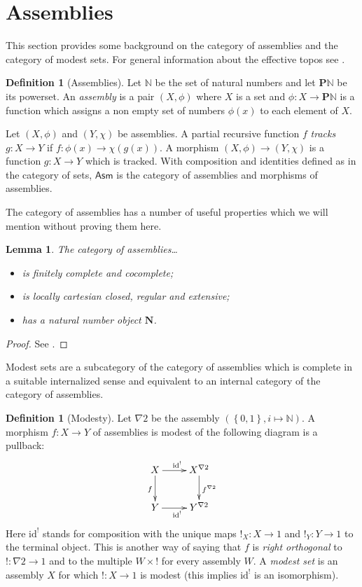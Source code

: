\documentclass{amsart}
\theoremstyle{plain}
\newtheorem{lemma}[theorem]{Lemma}
\theoremstyle{definition}
\newtheorem{defin}[theorem]{Definition}
\newcommand\set[1]{\left\{#1\right\}}
\newcommand\id{\mathrm{id}}
\newcommand\N{\mathbb N}
\newcommand\pow{\mathbf P}
\newcommand\Asm{\mathsf{Asm}}
\begin{document}
\section{Assemblies}
This section provides some background on the category of assemblies and the category of modest sets. For general information about the effective topos see \cite{MR2479466}.

\begin{defin}[Assemblies] Let $\N$ be the set of natural numbers and let $\pow\N$ be its powerset.
An \emph{assembly} is a pair $(X,\phi)$ where $X$ is a set and $\phi:X\to \pow \N$ is a function which assigns a non empty set of numbers $\phi(x)$ to each element of $X$.

Let $(X,\phi)$ and $(Y,\chi)$ be assemblies. A partial recursive function $f$ \emph{tracks} $g:X\to Y$ if $f: \phi(x) \to \chi(g(x))$. A morphism $(X,\phi)\to (Y,\chi)$ is a function $g:X\to Y$ which is tracked. With composition and identities defined as in the category of sets, $\Asm$ is the category of assemblies and morphisms of assemblies.
\end{defin}

The category of assemblies has a number of useful properties which we will mention without proving them here.

\newcommand\nno{\mathbf N}
\begin{lemma} The category of assemblies\dots
\begin{itemize}
\item is finitely complete and cocomplete;
\item is locally cartesian closed, regular and extensive;
\item has a natural number object $\nno$.
\end{itemize}

\label{bicartesian closed + nno}
\end{lemma}

\begin{proof} See \cite{MR2479466,MSC:8896618,RealCats}. \end{proof}

Modest sets are a subcategory of the category of assemblies which is complete in a suitable internalized sense and equivalent to an internal category of the category of assemblies.

\newcommand\bang{!}
\begin{defin}[Modesty]
Let $\nabla 2$ be the assembly $(\set{0,1}, i \mapsto \N)$. A morphism $f:X\to Y$ of assemblies is modest of the following diagram is a pullback:
\[\xymatrix{
X \ar[r]^{\id^\bang} \ar[d]_{f} & X^{\nabla 2} \ar[d]^{f^{\nabla 2}}\\
Y \ar[r]_{\id^\bang} & Y^{\nabla 2}
}\]
Here $\id^\bang$ stands for composition with the unique maps $\bang_X:X\to 1$ and $\bang_Y: Y\to 1$ to the terminal object. This is another way of saying that $f$ is \emph{right orthogonal} to $\bang:\nabla 2\to 1$ and to the multiple $W\times \bang$ for every assembly $W$. A \emph{modest set} is an assembly $X$ for which $\bang:X\to 1$ is modest (this implies $\id^\bang$ is an isomorphism).
\end{defin}
\end{document}
